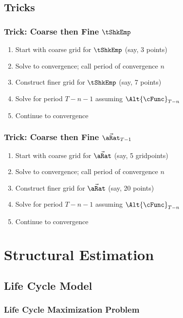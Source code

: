 \documentclass{beamer}
\begin{document}
\subsection{Tricks}
\begin{frame}
\frametitle{Trick: Coarse then Fine $\tShkEmp$}

\begin{enumerate}
\item Start with coarse grid for $\tShkEmp$ (say, 3 points)
\item Solve to convergence; call period of convergence $n$
\item Construct finer grid for $\tShkEmp$ (say, 7 points)
\item Solve for period $T-n-1$ assuming $\Alt{\cFunc}_{T-n}$ 
\item Continue to convergence
\end{enumerate}

\end{frame}

\begin{frame}
\frametitle{Trick: Coarse then Fine $\vec{\aRat}_{T-1}$}

\begin{enumerate}
\item Start with coarse grid for $\vec{\aRat}$ (say, 5 gridpoints)
\item Solve to convergence; call period of convergence $n$
\item Construct finer grid for $\vec{\aRat}$ (say, 20 points)
\item Solve for period $T-n-1$ assuming $\Alt{\cFunc}_{T-n}$ 
\item Continue to convergence
\end{enumerate}

\end{frame}

\section{Structural Estimation}
\subsection{Life Cycle Model}

\begin{frame}
\frametitle{Life Cycle Maximization Problem}


\end{frame}
\end{document}
